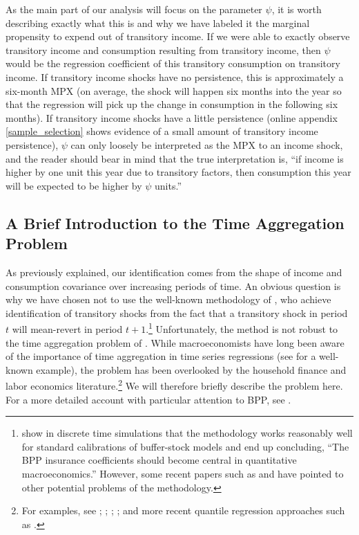 \documentclass[titlepage]{\econtex}\newcommand{\texname}{ConsumptionHeterogeneity}
\begin{document}
As the main part of our analysis will focus on the parameter $\psi$, it is worth describing exactly what this is and why we have labeled it the marginal propensity to expend out of transitory income. If we were able to exactly observe transitory income and consumption resulting from transitory income, then $\psi$ would be the regression coefficient of this transitory consumption on transitory income. If transitory income shocks have no persistence, this is approximately a six-month MPX (on average, the shock will happen six months into the year so that the regression will pick up the change in consumption in the following six months). If transitory income shocks have a little persistence (online appendix \ref{sample_selection} shows evidence of a small amount of transitory income persistence), $\psi$ can only loosely be interpreted as the MPX to an income shock, and the reader should bear in mind that the true interpretation is, ``if income is higher by one unit this year due to transitory factors, then consumption this year will be expected to be higher by $\psi$ units.''

\subsection{A Brief Introduction to the Time Aggregation Problem} \label{TimeAgg}
As previously explained, our identification comes from the shape of income and consumption covariance over increasing periods of time. An obvious question is why we have chosen not to use the well-known methodology of \cite{blundell_consumption_2008}, who achieve identification of transitory shocks from the fact that a transitory shock in period $t$ will mean-revert in period $t+1$.\footnote{\cite{kaplan_how_2010} show in discrete time simulations that the methodology works reasonably well for standard calibrations of buffer-stock models and end up concluding, ``The BPP insurance coefficients should become central in quantitative macroeconomics.'' However, some recent papers such as \cite{commault_how_2017} and \cite{hryshko_income_2018} have pointed to other potential problems of the methodology.} Unfortunately, the method is not robust to the time aggregation problem of \cite{working_note_1960}. While macroeconomists have long been aware of the importance of time aggregation in time series regressions (see \cite{campbell_consumption_1989} for a well-known example), the problem has been overlooked by the household finance and labor economics literature.\footnote{For examples, see \cite{moffitt_trends_2012}; \cite{meghir_income_2004}; \cite{nielsen_impact_2004}; \cite{heathcote_unequal_2010}; and more recent quantile regression approaches such as \cite{arellano_earnings_2017}.} We will therefore briefly describe the problem here. For a more detailed account with particular attention to BPP, see \cite{crawley_time_2019}.
\end{document}
